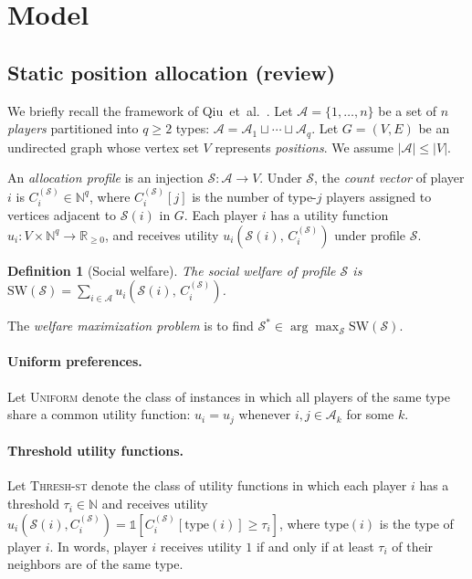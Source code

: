 \documentclass[11pt]{article}
\newtheorem{definition}{Definition}
\newcommand{\SW}{\mathrm{SW}}
\newcommand{\N}{\mathbb{N}}
\newcommand{\R}{\mathbb{R}}
\newcommand{\A}{\mathcal{A}}
\begin{document}
\section{Model}
\label{sec:model}

\subsection{Static position allocation (review)}

We briefly recall the framework of Qiu~et~al.~\cite{qiu2025welfare}.
Let $\A = \{1, \ldots, n\}$ be a set of $n$ \emph{players} partitioned into
$q \geq 2$ types: $\A = \A_1 \sqcup \cdots \sqcup \A_q$.
Let $G = (V, E)$ be an undirected graph whose vertex set $V$ represents
\emph{positions}.
We assume $|\A| \leq |V|$.

An \emph{allocation profile} is an injection $\mathcal{S} : \A \to V$.
Under $\mathcal{S}$, the \emph{count vector} of player $i$ is
$C_i^{(\mathcal{S})} \in \N^q$, where $C_i^{(\mathcal{S})}[j]$ is the number of
type-$j$ players assigned to vertices adjacent to $\mathcal{S}(i)$ in $G$.
Each player $i$ has a utility function $u_i : V \times \N^q \to \R_{\geq 0}$, and
receives utility $u_i\!\left(\mathcal{S}(i),\, C_i^{(\mathcal{S})}\right)$ under
profile $\mathcal{S}$.

\begin{definition}[Social welfare]
  The \emph{social welfare} of profile $\mathcal{S}$ is
  $\SW(\mathcal{S}) = \sum_{i \in \A} u_i\!\left(\mathcal{S}(i),\, C_i^{(\mathcal{S})}\right)$.
\end{definition}

The \emph{welfare maximization problem} is to find $\mathcal{S}^* \in \arg\max_\mathcal{S} \SW(\mathcal{S})$.

\paragraph{Uniform preferences.}
Let \textsc{Uniform} denote the class of instances in which all players of the same
type share a common utility function: $u_i = u_j$ whenever $i, j \in \A_k$ for some
$k$.

\paragraph{Threshold utility functions.}
Let \textsc{Thresh-st} denote the class of utility functions in which each player $i$
has a threshold $\tau_i \in \N$ and receives utility
$u_i(\mathcal{S}(i), C_i^{(\mathcal{S})}) = \mathds{1}\!\left[C_i^{(\mathcal{S})}[\mathrm{type}(i)] \geq \tau_i\right]$,
where $\mathrm{type}(i)$ is the type of player $i$.
In words, player $i$ receives utility $1$ if and only if at least $\tau_i$ of their
neighbors are of the same type.
\end{document}
